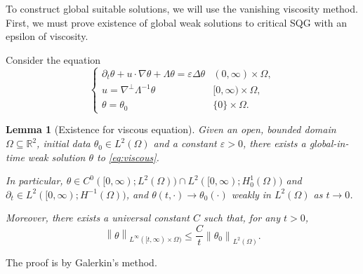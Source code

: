 \documentclass[11pt]{amsart}
\newtheorem{lemma}[theorem]{Lemma}
\theoremstyle{remark}
\theoremstyle{definition}
\newcommand{\R}{\mathbb{R}}
\newcommand{\eps}{\varepsilon}
\newcommand{\norm}[1]{\left\lVert#1\right\rVert}
\newcommand{\del}{\partial}
\newcommand{\grad}{\nabla}
\newcommand{\Laplace}{\Delta}
\newcommand{\n}{^{-1}}
\begin{document}
To construct global suitable solutions, we will use the vanishing viscosity method.  First, we must prove existence of global weak solutions to critical SQG with an epsilon of viscosity.  

Consider the equation
\begin{equation} \label{eq:viscous} \begin{cases}
\del_t \theta + u\cdot \grad \theta + \Lambda \theta = \eps \Laplace \theta & (0,\infty) \times \Omega,
\\ u = \grad^\perp \Lambda\n \theta & [0,\infty) \times \Omega,
\\ \theta = \theta_0 & \{0\} \times \Omega.
\end{cases} \end{equation}

\begin{lemma}[Existence for viscous equation] \label{thm:viscous}
Given an open, bounded domain $\Omega \subseteq \R^2$, initial data $\theta_0 \in L^2(\Omega)$ and a constant $\eps > 0$, there exists a global-in-time weak solution $\theta$ to \eqref{eq:viscous}.  

In particular, $\theta \in C^0([0,\infty);L^2(\Omega)) \cap L^2([0,\infty);H_0^1(\Omega))$ and $\del_t \in L^2([0,\infty);H^{-1}(\Omega))$, and $\theta(t,\cdot) \to \theta_0(\cdot)$ weakly in $L^2(\Omega)$ as $t \to 0$.  

Moreover, there exists a universal constant $C$ such that, for any $t>0$, 
\[ \norm{\theta}_{L^\infty([t,\infty)\times\Omega)} \leq \frac{C}{t} \norm{\theta_0}_{L^2(\Omega)}. \]
\end{lemma}
The proof is by Galerkin's method.  
\end{document}
